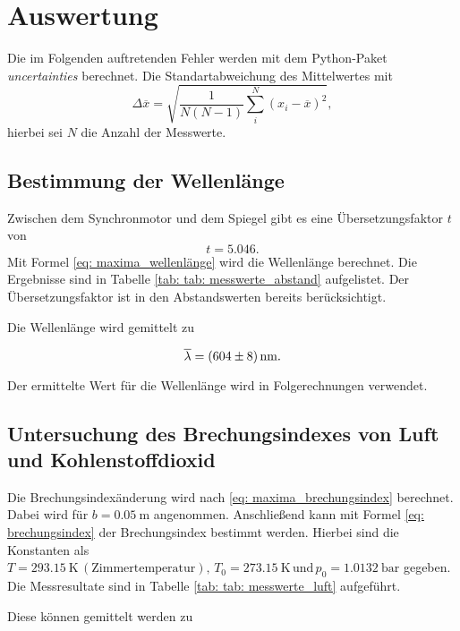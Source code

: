 \newpage
\section{Auswertung}

Die im Folgenden auftretenden Fehler werden mit dem
Python-Paket \emph{uncertainties}\cite{uncertainties} berechnet.
Die Standartabweichung des Mittelwertes mit
\begin{equation}
  \label{eq:standartabweichung}
  \Delta\overline{x}=\sqrt{\frac{1}{N(N-1)}\sum_{i}^N \left(x_i-\overline{x}\right)^2},
\end{equation}
hierbei sei $N$ die Anzahl der Messwerte.

\subsection{Bestimmung der Wellenlänge}
Zwischen dem Synchronmotor und dem Spiegel gibt es eine Übersetzungsfaktor $t$ von
\begin{equation*}
  t=5.046. %
\end{equation*}
Mit Formel \eqref{eq: maxima_wellenlänge} wird die Wellenlänge berechnet.
Die Ergebnisse sind in Tabelle \ref{tab: tab: messwerte_abstand} aufgelistet.
Der Übersetzungsfaktor ist in den Abstandswerten bereits berücksichtigt.



Die Wellenlänge wird gemittelt zu

\begin{equation}
  \label{eq:wellenlaenge}
  \overline{\lambda}=\SI{604\pm 8}{\nano\meter}.
\end{equation}

Der ermittelte Wert für die Wellenlänge wird in Folgerechnungen verwendet.

\subsection{Untersuchung des Brechungsindexes von Luft und Kohlenstoffdioxid}

Die Brechungsindexänderung wird nach \eqref{eq: maxima_brechungsindex} berechnet. Dabei wird
für $b=\SI{0.05}{\meter}$ angenommen. Anschließend kann mit Formel \eqref{eq: brechungsindex}
der Brechungsindex bestimmt werden. Hierbei sind die Konstanten als $T=\SI{293.15}{\kelvin}\, \left(\text{Zimmertemperatur}\right),\, T_0=\SI{273.15}{\kelvin} \, %
\text{und} \, p_0=\SI{1.0132}{\bar}$ gegeben.\cite{anleitung401}
Die Messresultate sind in Tabelle \ref{tab: tab: messwerte_luft} aufgeführt.

Diese können gemittelt werden zu

